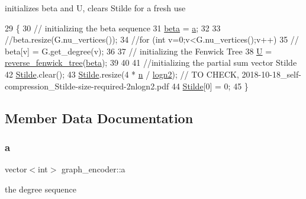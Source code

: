 initializes beta and U, clears Stilde for a fresh use 


\begin{DoxyCode}
29 \{
30   \textcolor{comment}{// initializing the beta sequence}
31   \hyperlink{classgraph__encoder_a40880adecfd63fb86e94b4b0fc3f6bc2}{beta} = \hyperlink{classgraph__encoder_a56eb5cf480ae5c2fca9f3a45f2ffd4f1}{a}; 
32 
33   \textcolor{comment}{//beta.resize(G.nu\_vertices());}
34   \textcolor{comment}{//for (int v=0;v<G.nu\_vertices();v++)}
35   \textcolor{comment}{//  beta[v] = G.get\_degree(v);  }
36 
37   \textcolor{comment}{// initializing the Fenwick Tree}
38   \hyperlink{classgraph__encoder_a3314c40920f2ee132958a6b0ce7e7995}{U} = \hyperlink{classreverse__fenwick__tree}{reverse\_fenwick\_tree}(\hyperlink{classgraph__encoder_a40880adecfd63fb86e94b4b0fc3f6bc2}{beta});
39 
40 
41   \textcolor{comment}{//initializing the partial sum vector Stilde}
42   \hyperlink{classgraph__encoder_a342688a3fdee511b7fae3f155cfb10cf}{Stilde}.clear();
43   \hyperlink{classgraph__encoder_a342688a3fdee511b7fae3f155cfb10cf}{Stilde}.resize(4 * \hyperlink{classgraph__encoder_a7fedc9ace19e34abb32f1851c8597591}{n} / \hyperlink{classgraph__encoder_a27fde3a95a280304877b1e37fc4d8553}{logn2}); \textcolor{comment}{// TO CHECK,
       2018-10-18\_self-compression\_Stilde-size-required-2nlogn2.pdf}
44   \hyperlink{classgraph__encoder_a342688a3fdee511b7fae3f155cfb10cf}{Stilde}[0] = 0;
45 \}
\end{DoxyCode}


\subsection{Member Data Documentation}
\mbox{\label{classgraph__encoder_a56eb5cf480ae5c2fca9f3a45f2ffd4f1}} 
\subsubsection{\texorpdfstring{a}{a}}
{\footnotesize\ttfamily vector$<$int$>$ graph\+\_\+encoder\+::a\hspace{0.3cm}{\ttfamily [private]}}



the degree sequence 

\mbox{\label{classgraph__encoder_a40880adecfd63fb86e94b4b0fc3f6bc2}} 
